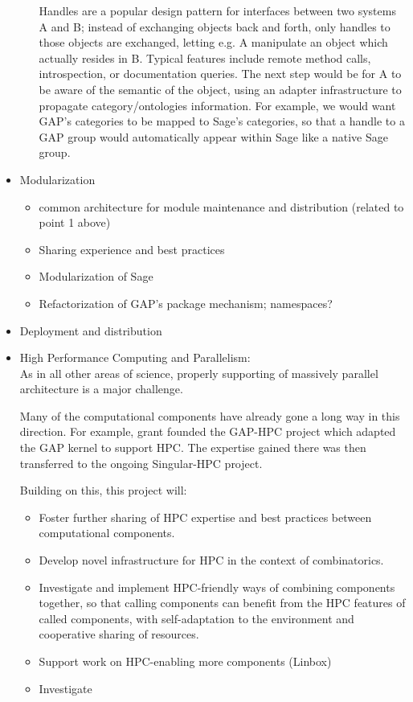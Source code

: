 \begin{Workpackage}{\thewpno}
\begin{WPDescription}
\begin{itemize}
\begin{itemize}
      Handles are a popular design pattern for interfaces between two
      systems A and B; instead of exchanging objects back and forth,
      only handles to those objects are exchanged, letting e.g. A
      manipulate an object which actually resides in B. Typical
      features include remote method calls, introspection, or
      documentation queries. The next step would be for A to be aware
      of the semantic of the object, using an adapter infrastructure
      to propagate category/ontologies information. For example, we
      would want GAP's categories to be mapped to Sage's categories,
      so that a handle to a GAP group would automatically appear
      within Sage like a native Sage group.
    \end{itemize}

  \item Modularization
    \begin{itemize}
    \item common architecture for module maintenance and
      distribution (related to point 1 above)
    \item Sharing experience and best practices
    \item Modularization of Sage
    \item Refactorization of GAP's package mechanism; namespaces?
    \end{itemize}

  \item Deployment and distribution

  \item High Performance Computing and Parallelism:\\
    As in all other areas of science, properly supporting of massively
    parallel architecture is a major challenge.

    Many of the computational components have already gone a long way
    in this direction. For example, grant  founded the
    GAP-HPC project which adapted the GAP kernel to support HPC. The
    expertise gained there was then transferred to the ongoing
    Singular-HPC project.

    Building on this, this project will:
    \begin{itemize}
    \item Foster further sharing of HPC expertise and best practices
      between computational components.
    \item Develop novel infrastructure for HPC in the context of
      combinatorics.
    \item Investigate and implement HPC-friendly ways of combining
      components together, so that calling components can benefit from
      the HPC features of called components, with self-adaptation to
      the environment and cooperative sharing of resources.
    \item Support work on HPC-enabling more components (Linbox)
    \item Investigate 
    \end{itemize}
  \end{itemize}
\end{WPDescription}


\end{Workpackage}
